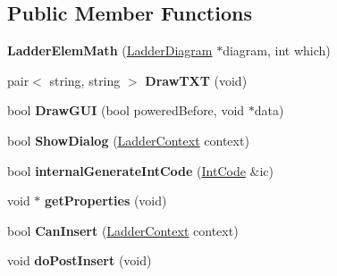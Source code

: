 \subsection*{Public Member Functions}
\begin{DoxyCompactItemize}
\item 
\hypertarget{class_ladder_elem_math_a8d6a3df031c139f5e81f93d044be7a22}{{\bfseries Ladder\-Elem\-Math} (\hyperlink{class_ladder_diagram}{Ladder\-Diagram} $\ast$diagram, int which)}\label{class_ladder_elem_math_a8d6a3df031c139f5e81f93d044be7a22}

\item 
\hypertarget{class_ladder_elem_math_af7cef4469c605f9b87a322a215c8c16a}{pair$<$ string, string $>$ {\bfseries Draw\-T\-X\-T} (void)}\label{class_ladder_elem_math_af7cef4469c605f9b87a322a215c8c16a}

\item 
\hypertarget{class_ladder_elem_math_a0ddf923301b57a233e2a899f1d9187ec}{bool {\bfseries Draw\-G\-U\-I} (bool powered\-Before, void $\ast$data)}\label{class_ladder_elem_math_a0ddf923301b57a233e2a899f1d9187ec}

\item 
\hypertarget{class_ladder_elem_math_a1a8327caf04accce4242e3a90eb9d1c2}{bool {\bfseries Show\-Dialog} (\hyperlink{struct_ladder_context}{Ladder\-Context} context)}\label{class_ladder_elem_math_a1a8327caf04accce4242e3a90eb9d1c2}

\item 
\hypertarget{class_ladder_elem_math_af4a9739a663efab7a705326940c9a2da}{bool {\bfseries internal\-Generate\-Int\-Code} (\hyperlink{class_int_code}{Int\-Code} \&ic)}\label{class_ladder_elem_math_af4a9739a663efab7a705326940c9a2da}

\item 
\hypertarget{class_ladder_elem_math_a8c6bc1193cc45b86178fbc50e91c080e}{void $\ast$ {\bfseries get\-Properties} (void)}\label{class_ladder_elem_math_a8c6bc1193cc45b86178fbc50e91c080e}

\item 
\hypertarget{class_ladder_elem_math_a3551747bba8497ff08a70a43f50eabd3}{bool {\bfseries Can\-Insert} (\hyperlink{struct_ladder_context}{Ladder\-Context} context)}\label{class_ladder_elem_math_a3551747bba8497ff08a70a43f50eabd3}

\item 
\hypertarget{class_ladder_elem_math_adaf500905852a5f2936804fe6675a10e}{void {\bfseries do\-Post\-Insert} (void)}\label{class_ladder_elem_math_adaf500905852a5f2936804fe6675a10e}


\end{DoxyCompactItemize}
